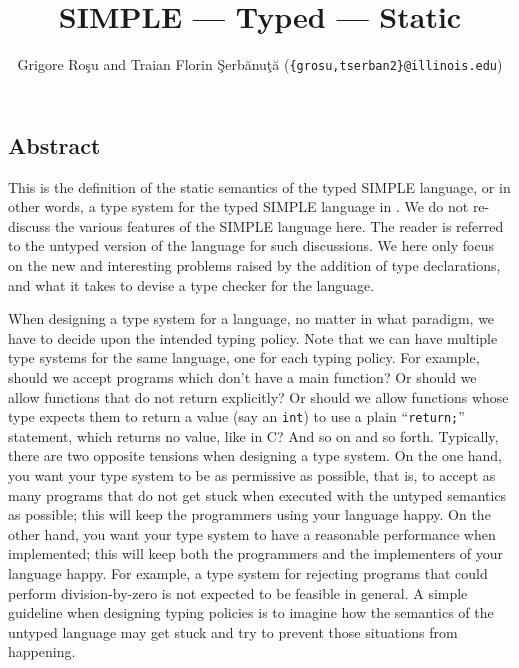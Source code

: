 \setlength{\parindent}{1em}
\title{SIMPLE --- Typed --- Static}
\author{Grigore Ro\c{s}u and 
        Traian Florin \c{S}erb\u{a}nu\c{t}\u{a}
        (\texttt{\{grosu,tserban2\}@illinois.edu})}

\maketitle

\begin{kblock}[text]
\section{Abstract}
This is the \K definition of the static semantics of the typed SIMPLE
language, or in other words, a type system for the typed SIMPLE
language in \K.  We do not re-discuss the various features of the
SIMPLE language here.  The reader is referred to the untyped version of
the language for such discussions.  We here only focus on the new and
interesting problems raised by the addition of type declarations, and
what it takes to devise a type checker for the language.

When designing a type system for a language, no matter in what
paradigm, we have to decide upon the intended typing policy.  Note
that we can have multiple type systems for the same language, one for
each typing policy.  For example, should we accept programs which
don't have a main function?  Or should we allow functions that do not
return explicitly?  Or should we allow functions whose type expects
them to return a value (say an \texttt{int}) to use a plain
``\texttt{return;}'' statement, which returns no value, like in C?
And so on and so forth.  Typically, there are two opposite tensions
when designing a type system.  On the one hand, you want your type
system to be as permissive as possible, that is, to accept as many
programs that do not get stuck when executed with the untyped
semantics as possible; this will keep the programmers using your
language happy.  On the other hand, you want your type system to have
a reasonable performance when implemented; this will keep both the
programmers and the implementers of your language happy.  For example,
a type system for rejecting programs that could perform
division-by-zero is not expected to be feasible in general.  A simple
guideline when designing typing policies is to imagine how the
semantics of the untyped language may get stuck and try to prevent
those situations from happening.


\end{kblock}

